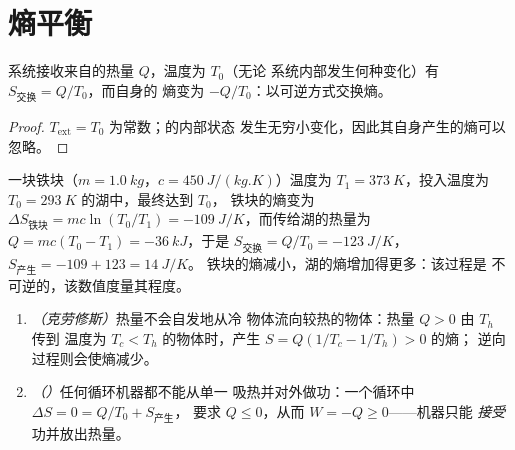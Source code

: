 \section{熵平衡}

\begin{proposition}[与热源交换的热量]\label{prop:b1:second-law-entropy:thermostat}
系统接收来自的热量 $Q$，温度为 $T_0$（无论
系统内部发生何种变化）有 $S_{\text{交换}} = Q/T_0$，而自身的
熵变为 $-Q/T_0$：以可逆方式交换熵。
\end{proposition}

\begin{proof}
$T_{\mathrm{ext}} = T_0$ 为常数；的内部状态
发生无穷小变化，因此其自身产生的熵可以忽略。
\end{proof}

\begin{example}[冷湖中的热物体]\label{ex:b1:second-law-entropy:quench}
一块铁块（$m = \qty{1.0}{kg}$，$c = \qty{450}{J/(kg.K)}$）温度为 $T_1 =
\qty{373}{K}$，投入温度为 $T_0 = \qty{293}{K}$ 的湖中，最终达到 $T_0$，
铁块的熵变为 $\Delta S_{\text{铁块}} = mc\ln(T_0/T_1) = \qty{-109}{J/K}$，而传给湖的热量为 $Q =
mc(T_0 - T_1) = \qty{-36}{kJ}$，于是 $S_{\text{交换}} =
Q/T_0 = \qty{-123}{J/K}$，$S_{\text{产生}} = -109 + 123 = \qty{+14}{J/K}$。
铁块的熵减小，湖的熵增加得更多：该过程是
不可逆的，该数值度量其程度。
\end{example}

\begin{proposition}[两个推论]\label{prop:b1:second-law-entropy:clausiuskelvin}
\begin{enumerate}
  \item \emph{（克劳修斯）}热量不会自发地从冷
        物体流向较热的物体：热量 $Q > 0$ 由 $T_h$ 传到
        温度为 $T_c < T_h$ 的物体时，产生 $S = Q(1/T_c - 1/T_h) > 0$ 的熵；
        逆向过程则会使熵减少。
  \item \emph{（）}任何循环机器都不能从单一
        吸热并对外做功：一个循环中 $\Delta S = 0 = Q/T_0 + S_{\text{产生}}$，
        要求 $Q \leq 0$，从而 $W = -Q \geq 0$——机器只能
        \emph{接受}功并放出热量。
\end{enumerate}
\end{proposition}

